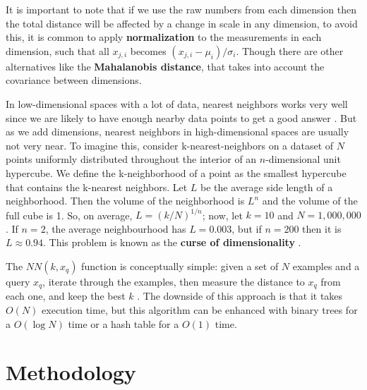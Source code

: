 \documentclass[10pt]{article}
\begin{document}
It is important to note that if we use the raw numbers from each dimension then the total distance will be affected by a change in scale in any dimension, to avoid this, it is common to apply \textbf{normalization} to the measurements in each dimension, such that all $x_{j, i}$ becomes $(x_{j, i} - \mu_{i}) / \sigma_{i}$. Though there are other alternatives like the \textbf{Mahalanobis distance}, that takes into account the covariance between dimensions. \par
In low-dimensional spaces with a lot of data, nearest neighbors works very well since we are likely to have enough nearby data points to get a good answer \cite{ai}. But as we add dimensions, nearest neighbors in high-dimensional spaces are usually not very near. To imagine this, consider k-nearest-neighbors on a dataset of $N$ points uniformly distributed throughout the interior of an $n$-dimensional unit hypercube. We define the k-neighborhood of a point as the smallest hypercube that contains the k-nearest neighbors. Let $L$ be the average side length of a neighborhood. Then the volume of the neighborhood is $L^{n}$ and the volume of the full cube is 1. So, on average, $L = (k/N)^{1/n}$; now, let $k = 10$ and $N = 1,000,000$. If $n=2$, the average neighbourhood has $L=0.003$, but if $n=200$ then it is $L \approx 0.94$. This problem is known as the \textbf{curse of dimensionality} \cite{ai}. \par
The $NN(k, x_{q})$ function is conceptually simple: given a set of $N$ examples and a query $x_{q}$, iterate through the examples, then measure the distance to $x_{q}$ from each one, and keep the best $k$ \cite{ai}. The downside of this approach is that it takes $O(N)$ execution time, but this algorithm can be enhanced with binary trees for a $O(\log N)$ time or a hash table for a $O(1)$ time.

\section{Methodology}
\end{document}
